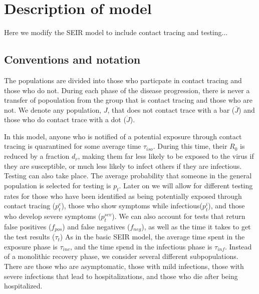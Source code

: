 \documentclass{article}
\begin{document}
\section{Description of model}
Here we modify the SEIR model to include contact tracing and testing...

\subsection{Conventions and notation}
The populations are divided into those who particpate in contact tracing and those who do not. During each phase of the disease progression, there is never a transfer of popoulation from the group that is contact tracing and those who are not. We denote any population, $J$, that does not contact trace with a bar ($\bar{J}$) and those who do contact trace with a dot ($\dot{J}$). 

In this model, anyone who is notified of a potential exposure through contact tracing is quarantined for some average time $\tau_{iso}$. During this time, their $R_{0}$ is reduced by a fraction $d_{r}$, making them far less likely to be exposed to the virus if they are susceptible, or much less likely to infect others if they are infectious. Testing can also take place. The average probability that someone in the general population is selected for testing is $p_{t}$. Later on we will allow for different testing rates for those who have been identified as being potentially exposed through contact tracing ($p^{c}_{t}$), those who show symptoms while infectious($p^{i}_{t}$), and those who develop severe symptoms ($p^{sev}_{t}$). We can also account for tests that return false positives ($f_{pos}$) and false negatives ($f_{neg}$), as well as the time it takes to get the test results ($\tau_{t}$) As in the basic SEIR model, the average time spent in the exposure phase is $\tau_{inc}$, and the time spend in the infectious phase is $\tau_{inf}$. Instead of a monolithic recovery phase, we consider several different subpopulations. There are those who are asymptomatic, those with mild infections, those with severe infections that lead to hospitalizations, and those who die after being hospitalized.
\end{document}
